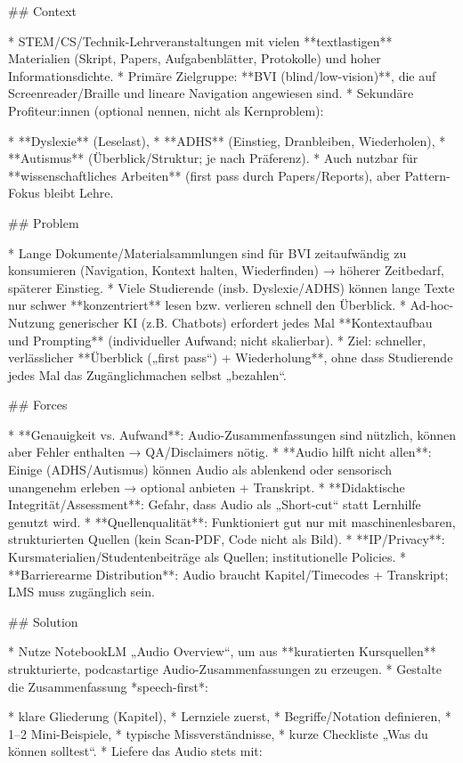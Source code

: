## Context

* STEM/CS/Technik-Lehrveranstaltungen mit vielen **textlastigen** Materialien (Skript, Papers, Aufgabenblätter, Protokolle) und hoher Informationsdichte.
* Primäre Zielgruppe: **BVI (blind/low-vision)**, die auf Screenreader/Braille und lineare Navigation angewiesen sind.
* Sekundäre Profiteur:innen (optional nennen, nicht als Kernproblem):

  * **Dyslexie** (Leselast),
  * **ADHS** (Einstieg, Dranbleiben, Wiederholen),
  * **Autismus** (Überblick/Struktur; je nach Präferenz).
* Auch nutzbar für **wissenschaftliches Arbeiten** (first pass durch Papers/Reports), aber Pattern-Fokus bleibt Lehre.

## Problem

* Lange Dokumente/Materialsammlungen sind für BVI zeitaufwändig zu konsumieren (Navigation, Kontext halten, Wiederfinden) → höherer Zeitbedarf, späterer Einstieg.
* Viele Studierende (insb. Dyslexie/ADHS) können lange Texte nur schwer **konzentriert** lesen bzw. verlieren schnell den Überblick.
* Ad-hoc-Nutzung generischer KI (z.B. Chatbots) erfordert jedes Mal **Kontextaufbau und Prompting** (individueller Aufwand; nicht skalierbar).
* Ziel: schneller, verlässlicher **Überblick („first pass“) + Wiederholung**, ohne dass Studierende jedes Mal das Zugänglichmachen selbst „bezahlen“.

## Forces

* **Genauigkeit vs. Aufwand**: Audio-Zusammenfassungen sind nützlich, können aber Fehler enthalten → QA/Disclaimers nötig.
* **Audio hilft nicht allen**: Einige (ADHS/Autismus) können Audio als ablenkend oder sensorisch unangenehm erleben → optional anbieten + Transkript.
* **Didaktische Integrität/Assessment**: Gefahr, dass Audio als „Short-cut“ statt Lernhilfe genutzt wird.
* **Quellenqualität**: Funktioniert gut nur mit maschinenlesbaren, strukturierten Quellen (kein Scan-PDF, Code nicht als Bild).
* **IP/Privacy**: Kursmaterialien/Studentenbeiträge als Quellen; institutionelle Policies.
* **Barrierearme Distribution**: Audio braucht Kapitel/Timecodes + Transkript; LMS muss zugänglich sein.

## Solution

* Nutze NotebookLM „Audio Overview“, um aus **kuratierten Kursquellen** strukturierte, podcastartige Audio-Zusammenfassungen zu erzeugen.
* Gestalte die Zusammenfassung *speech-first*:

  * klare Gliederung (Kapitel),
  * Lernziele zuerst,
  * Begriffe/Notation definieren,
  * 1–2 Mini-Beispiele,
  * typische Missverständnisse,
  * kurze Checkliste „Was du können solltest“.
* Liefere das Audio stets mit:

